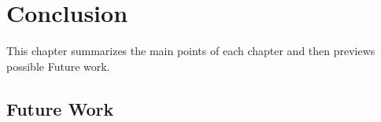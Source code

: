 \chapter{Conclusion}

This chapter summarizes the main points of each chapter and then previews possible Future work.


\section{Future Work}

